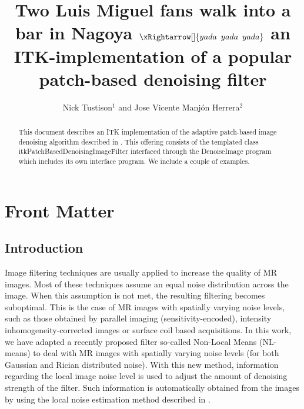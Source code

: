 \documentclass{InsightArticle}
\title{Two Luis Miguel fans walk into a bar in Nagoya $\xRightarrow[]{yada\,\,\,yada\,\,\,yada}$
an ITK-implementation of a popular patch-based denoising filter}
\author{Nick Tustison$^{1}$ and Jose Vicente Manj\'on Herrera$^{2}$}
\newcommand{\IJhandlerIDnumber}{1338}
\begin{document}
%
%
\IJhandlefooter{\IJhandlerIDnumber}




\maketitle


\ifhtml
\chapter*{Front Matter\label{front}}
\fi


\begin{abstract}
\noindent
This document describes an ITK implementation of the adaptive patch-based
image denoising algorithm described in \cite{Manjon:2010aa}.  This offering consists
of the templated class itkPatchBasedDenoisingImageFilter interfaced through
the DenoiseImage program which includes its own interface program.  We include
a couple of examples.
\end{abstract}

\IJhandlenote{\IJhandlerIDnumber}


\section{Introduction}

Image filtering techniques are usually applied to increase the quality of MR images.
Most of these techniques assume an equal noise distribution across the image. When this
assumption is not met, the resulting filtering becomes suboptimal. This is the case of MR
images with spatially varying noise levels, such as those obtained by parallel imaging
(sensitivity-encoded), intensity inhomogeneity-corrected images or surface coil based
acquisitions. In this work, we have adapted a recently proposed filter so-called
Non-Local Means (NL-means) to deal with MR images with spatially varying noise levels
(for both Gaussian and Rician distributed noise). With this new method, information
regarding the local image noise level is used to adjust the amount of denoising strength
of the filter. Such information is automatically obtained from the images by using the
local noise estimation method described in \cite{Manjon:2010aa}.
\end{document}
